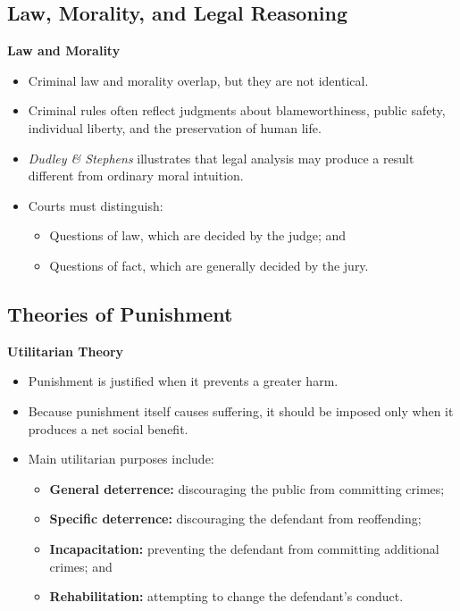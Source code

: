 \documentclass[11pt]{tex/lawoutline}
\begin{document}
\subsection{Law, Morality, and Legal Reasoning}

\textbf{Law and Morality}
\begin{itemize}
    \item Criminal law and morality overlap, but they are not identical.
    \item Criminal rules often reflect judgments about blameworthiness, public safety, individual liberty, and the preservation of human life.
    \item \textit{Dudley \& Stephens} illustrates that legal analysis may produce a result different from ordinary moral intuition.
    \item Courts must distinguish:
    \begin{itemize}
        \item Questions of law, which are decided by the judge; and
        \item Questions of fact, which are generally decided by the jury.
    \end{itemize}
\end{itemize}


\subsection{Theories of Punishment}

\textbf{Utilitarian Theory}
\begin{itemize}
    \item Punishment is justified when it prevents a greater harm.
    \item Because punishment itself causes suffering, it should be imposed only when it produces a net social benefit.
    \item Main utilitarian purposes include:
    \begin{itemize}
        \item \textbf{General deterrence:} discouraging the public from committing crimes;
        \item \textbf{Specific deterrence:} discouraging the defendant from reoffending;
        \item \textbf{Incapacitation:} preventing the defendant from committing additional crimes; and
        \item \textbf{Rehabilitation:} attempting to change the defendant's conduct.
    \end{itemize}
\end{itemize}
\end{document}
